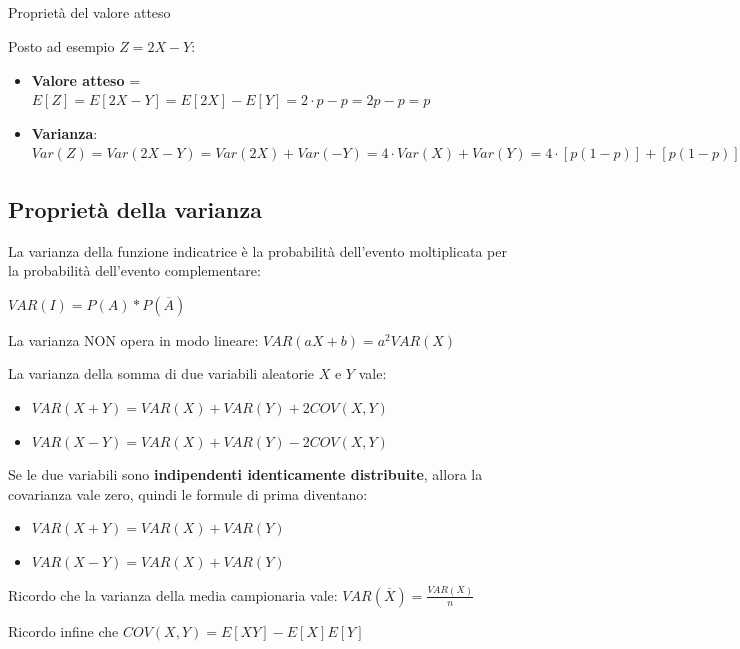 \documentclass{article}
\begin{document}
\subsection*{}{Proprietà del valore atteso}

Posto ad esempio $Z = 2X - Y$:

\begin{itemize}
    \item \textbf{Valore atteso} = $E[Z] = E[2X - Y] = E[2X] - E[Y] = 2 \cdot p - p = 2p - p = p$
    \item \textbf{Varianza}:  $Var(Z) = Var(2X - Y) = Var(2X) + Var(-Y) = 4 \cdot Var(X) + Var(Y) = 4 \cdot [p(1-p)] + [p(1-p)] = 4 \cdot (p - p^2) + [p - p^2] = 4p - 4p^2 + p - p^2 = -5p^2 + 5p = 5p(1 - p)$
\end{itemize}

\subsection*{Proprietà della varianza}

La varianza della funzione indicatrice è la probabilità dell'evento moltiplicata per la probabilità dell'evento complementare:

$VAR(I) = P(A) * P(\overline{A})$

La varianza NON opera in modo lineare: $VAR(aX + b) = a^2 VAR(X)$

La varianza della somma di due variabili aleatorie $X$ e $Y$ vale:

\begin{itemize}
    \item $VAR(X + Y) = VAR(X) + VAR(Y) + 2COV(X,Y)$
    \item $VAR(X - Y) = VAR(X) + VAR(Y) - 2COV(X,Y)$
\end{itemize}

Se le due variabili sono \textbf{indipendenti identicamente distribuite}, allora la covarianza vale zero, quindi le formule di prima diventano:

\begin{itemize}
    \item $VAR(X + Y) = VAR(X) + VAR(Y)$
    \item $VAR(X - Y) = VAR(X) + VAR(Y)$
\end{itemize}

Ricordo che la varianza della media campionaria vale: $VAR(\overline{X}) = \frac{VAR(X)}{n}$

Ricordo infine che $COV(X, Y) = E[XY] - E[X]E[Y]$
\end{document}
